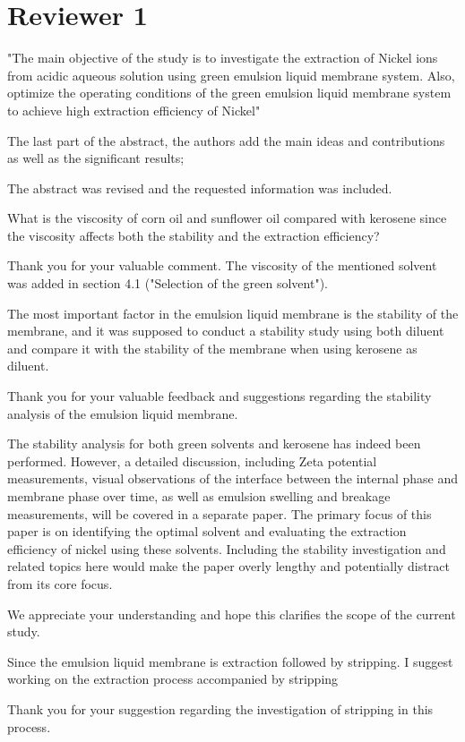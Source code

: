 \documentclass[11pt,answers]{exam}
\begin{document}
\section*{Reviewer 1}
"The main objective of the study is to investigate the extraction of Nickel ions from acidic aqueous solution using green emulsion liquid membrane system.  Also, optimize the operating conditions of the green emulsion liquid membrane system to achieve high extraction efficiency of Nickel" 
\begin{questions}
\question The last part of the abstract, the authors add the main ideas and contributions as well as the significant results;
 \begin{solutionorbox}[5.5cm]
 The abstract was revised and the requested information was included.
 \end{solutionorbox}
\question What is the viscosity of corn oil and sunflower oil compared with kerosene since the viscosity affects both the stability and the extraction efficiency?
 \begin{solutionorbox}[5.5cm]
Thank you for your valuable comment. The viscosity of the mentioned solvent was added in section 4.1 ("Selection of the green solvent").
 \end{solutionorbox}
\question The most important factor in the emulsion liquid membrane is the stability of the membrane, and it was supposed to conduct a stability study using both diluent and compare it with the stability of the membrane when using kerosene as diluent.
 \begin{solutionorbox}[5.5cm]
Thank you for your valuable feedback and suggestions regarding the stability analysis of the emulsion liquid membrane.

The stability analysis for both green solvents and kerosene has indeed been performed. However, a detailed discussion, including Zeta potential measurements, visual observations of the interface between the internal phase and membrane phase over time, as well as emulsion swelling and breakage measurements, will be covered in a separate paper. The primary focus of this paper is on identifying the optimal solvent and evaluating the extraction efficiency of nickel using these solvents. Including the stability investigation and related topics here would make the paper overly lengthy and potentially distract from its core focus.

We appreciate your understanding and hope this clarifies the scope of the current study.

\end{solutionorbox}
\question Since the emulsion liquid membrane is extraction followed by stripping. I suggest working on the extraction process accompanied by stripping
 \begin{solutionorbox}[5.5cm]
 Thank you for your suggestion regarding the investigation of stripping in this process.


\end{solutionorbox}
\end{questions}
\end{document}
